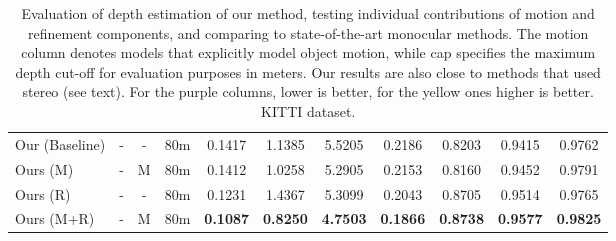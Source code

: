 \documentclass[letterpaper]{article} \usepackage{aaai19}  \usepackage{times}  \usepackage{helvet}  \usepackage{courier}  \usepackage{url}  \usepackage{graphicx}  \frenchspacing
\begin{document}
\begin{table*} [h!]
{\begin{tabular}{|l|c|c|c||c|c|c|c|c|c|c|}
  \hline
  
  Our (Baseline) & - & - & 80m   &0.1417    &1.1385    &5.5205    &0.2186    &0.8203    &0.9415    &0.9762  \\
  
  Ours (M) & - & M & 80m & 0.1412    & 1.0258    &5.2905   & 0.2153    &0.8160    &0.9452    & 0.9791 \\
    
  Ours (R) & - & - & 80m  &0.1231    &1.4367    &5.3099    &0.2043    & 0.8705    &0.9514    &0.9765 \\

  Ours (M+R) & - & M & 80m  & \textbf{0.1087}    & \textbf{0.8250}    &\textbf{4.7503}    & \textbf{0.1866}    & \textbf{0.8738}    & \textbf{0.9577}    & \textbf{0.9825}  \\
  \hline
  \end{tabular}
  }
  \caption{Evaluation of depth estimation of our method, testing individual contributions of motion and refinement components, and comparing to state-of-the-art monocular methods. The motion column denotes models that explicitly model object motion, while cap specifies the maximum depth cut-off for evaluation purposes in meters. Our results are also close to methods that used stereo (see text). For the purple columns, lower is better, for the yellow ones higher is better. KITTI dataset. }
    \label{tab:kitti_eigen}
\end{table*}
\end{document}
